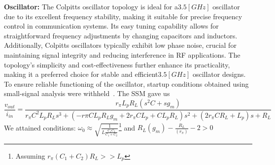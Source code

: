 \textbf{Oscillator:}
The Colpitts oscillator topology is ideal for a\(3.5[GHz]\) oscillator due to its excellent frequency stability, making it suitable for precise frequency control in communication systems. Its easy tuning capability allows for straightforward frequency adjustments by changing capacitors and inductors. Additionally, Colpitts oscillators typically exhibit low phase noise, crucial for maintaining signal integrity and reducing interference in RF applications. The topology’s simplicity and cost-effectiveness further enhance its practicality, making it a preferred choice for stable and efficient\(3.5[GHz]\) oscillator designs. To ensure reliable functioning of the oscillator, startup conditions obtained using small-signal analysis were withheld~\cite{Johnson1986ACO}. The SSM gave us
\[\frac{v_{out}}{i_{in}} = \frac{r_\pi L_p R_L(s^2C + sg_m)}{r_\pi C^2L_p R_L s^3  +(- r\pi C L_p R_L g_m + 2r_\pi CL_p + CL_pR_L)s^2 + (2r_\pi CR_L + L_p)s + R_L}\]
We attained conditions: \(\displaystyle \omega_0 \approx \sqrt{\frac{1}{\displaystyle L\frac{C_1 C_2}{C_1+C_2}}}\)\footnote{Assuming \(r_\pi (C_1+C_2)R_L >> L_p\)} and \(\displaystyle R_L (g_m) - \frac{R_L}{(r_\pi)} - 2 > 0\)

